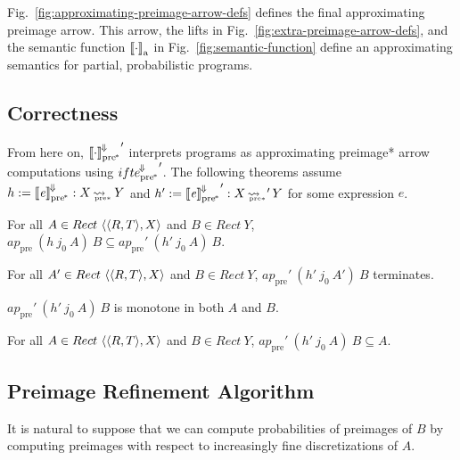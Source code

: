 \documentclass{llncs}
\newcommand{\figref}[1]{Fig.~\ref{#1}}
\newcommand{\arrow}{\rightsquigarrow}
\newcommand{\conv}{^{\mspace{-2mu}\Downarrow\mspace{-2mu}}}
\newcommand{\meaningofconv}[1]{\left\llbracket{#1}\right\rrbracket\conv}
\newcommand{\arrowconvif}{\ensuremath{ifte\conv}}
\newcommand{\gen}{_\mathrm{a}}
\newcommand{\pre}{_\mathrm{pre}}
\newcommand{\ppre}{_\mathrm{pre^{\mspace{-2mu}*}}}
\DeclareMathOperator{\ppreto}{\arrow_{\mspace{-19mu}_{\mathrm{pre*}}}}
\newcommand{\convifppre}{\arrowconvif\ppre}
\begin{document}
\figref{fig:approximating-preimage-arrow-defs} defines the final approximating preimage arrow.
This arrow, the lifts in \figref{fig:extra-preimage-arrow-defs}, and the semantic function $\meaningof{\cdot}\gen$ in \figref{fig:semantic-function} define an approximating semantics for partial, probabilistic programs.

\subsection{Correctness}

From here on, ${\meaningof{\cdot}\conv\ppre}'$ interprets programs as approximating preimage* arrow computations using ${\convifppre}'$.
The following theorems assume $h := \meaningofconv{\mathit{e}}\ppre : X \ppreto Y$ and $h' := {\meaningofconv{\mathit{e}}\ppre}' : X \ppreto' Y$ for some expression $\mathit{e}$.

\begin{theorem}[soundness]
\label{thm:approximation}
For all $A \in Rect~\langle{\langle{R,T}\rangle,X}\rangle$ and $B \in Rect~Y$, $ap\pre~(h~j_0~A)~B \subseteq ap\pre'~(h'~j_0~A)~B$.%
\end{theorem}

\begin{theorem}[termination]
For all $A' \in Rect~\langle{\langle{R,T}\rangle,X}\rangle$ and $B \in Rect~Y$, $ap\pre'~(h'~j_0~A')~B$ terminates.
\end{theorem}

\begin{theorem}[monotonicity]
\label{thm:monotonicity}
$ap\pre'~(h'~j_0~A)~B$ is monotone in both $A$ and $B$.%
\end{theorem}

\begin{theorem}[decreasing]
\label{thm:decreasing}
For all $A \in Rect~\langle{\langle{R,T}\rangle,X}\rangle$ and $B \in Rect~Y$, $ap\pre'~(h'~j_0~A)~B \subseteq A$.%
\end{theorem}

\subsection{Preimage Refinement Algorithm}
\label{sec:discretization}

It is natural to suppose that we can compute probabilities of preimages of $B$ by computing preimages with respect to increasingly fine discretizations of $A$.
\end{document}
